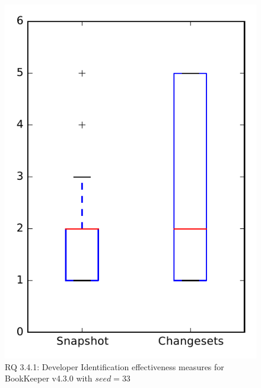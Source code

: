 
\begin{figure}
\centering
\includegraphics[height=0.4\textheight]{figures/dit_seed/rq1_bookkeeper_33}
\caption{RQ 3.4.1: Developer Identification effectiveness measures for BookKeeper v4.3.0 with $seed=33$}
\label{fig:dit_seed:rq1:bookkeeper}
\end{figure}
